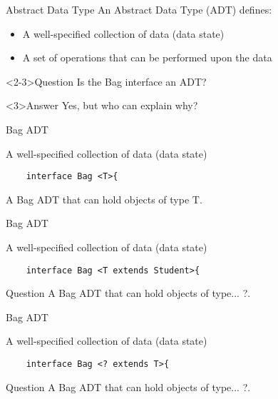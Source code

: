 \documentclass[pdf]{beamer}
\begin{document}
\begin{frame}{Abstract Data Type}
    An Abstract Data Type (ADT) defines:
    \begin{itemize}
        \item<1-3> A well-specified collection of data (data state)
        \item<1-3> A set of operations that can be performed upon the data
    \end{itemize}

    \begin{block}<2-3>{Question}
        Is the Bag interface an ADT?
    \end{block}

    \begin{block}<3>{Answer}
        Yes, but who can explain why?
    \end{block}
\end{frame}

\begin{frame}[fragile]{Bag ADT}
    \begin{block}{A well-specified collection of data (data state)}
        \begin{lstlisting}
    interface Bag <T>{
        \end{lstlisting}
    \end{block}

    A Bag ADT that can hold objects of type T.
\end{frame}

\begin{frame}[fragile]{Bag ADT}
    \begin{block}{A well-specified collection of data (data state)}
        \begin{lstlisting}
    interface Bag <T extends Student>{
        \end{lstlisting}
    \end{block}

    \begin{block}{Question}
        A Bag ADT that can hold objects of type... ?.
    \end{block}
\end{frame}

\begin{frame}[fragile]{Bag ADT}
    \begin{block}{A well-specified collection of data (data state)}
        \begin{lstlisting}
    interface Bag <? extends T>{
        \end{lstlisting}
    \end{block}

    \begin{block}{Question}
        A Bag ADT that can hold objects of type... ?.
    \end{block}
\end{frame}
\end{document}

